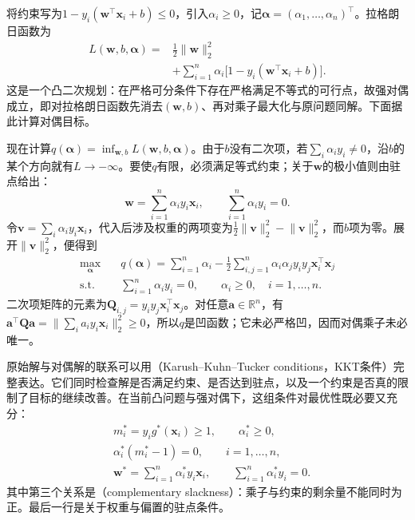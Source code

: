 将约束写为$1-y_i(\bm{w}^{\top}\bm{x}_i+b)\le0$，引入$\alpha_i\ge0$，记$\bm{\alpha}=(\alpha_1,\ldots,\alpha_n)^{\top}$。拉格朗日函数为
\begin{equation}
  \begin{aligned}
    L(\bm{w},b,\bm{\alpha})
    ={}&\frac12\lVert\bm{w}\rVert_2^2\\
      &+\sum_{i=1}^n\alpha_i
        \bigl[1-y_i(\bm{w}^{\top}\bm{x}_i+b)\bigr].
  \end{aligned}
  \label{eq:classification-svm-hard-lagrangian}
\end{equation}
这是一个凸二次规划：在严格可分条件下存在严格满足不等式的可行点，故强对偶成立，即对拉格朗日函数先消去$(\bm{w},b)$、再对乘子最大化与原问题同解。下面据此计算对偶目标。

现在计算$q(\bm{\alpha})=\inf_{\bm{w},b}L(\bm{w},b,\bm{\alpha})$。由于$b$没有二次项，若$\sum_i\alpha_i y_i\ne0$，沿$b$的某个方向就有$L\to-\infty$。要使$q$有限，必须满足等式约束；关于$\bm{w}$的极小值则由驻点给出：
\begin{equation}
  \bm{w}=\sum_{i=1}^n\alpha_i y_i\bm{x}_i,
  \qquad
  \sum_{i=1}^n\alpha_i y_i=0.
  \label{eq:classification-svm-stationarity}
\end{equation}
令$\bm{v}=\sum_i\alpha_i y_i\bm{x}_i$，代入后涉及权重的两项变为$\frac12\lVert\bm{v}\rVert_2^2-\lVert\bm{v}\rVert_2^2$，而$b$项为零。展开$\lVert\bm{v}\rVert_2^2$，便得到
\begin{equation}
  \begin{aligned}
    \max_{\bm{\alpha}}\quad&
      q(\bm{\alpha})
      =\sum_{i=1}^n\alpha_i
       -\frac12\sum_{i,j=1}^n
          \alpha_i\alpha_j y_i y_j
          \bm{x}_i^{\top}\bm{x}_j\\
    \text{s.t.}\quad&
      \sum_{i=1}^n\alpha_i y_i=0,\qquad
      \alpha_i\ge0,\quad i=1,\ldots,n.
  \end{aligned}
  \label{eq:classification-svm-hard-dual}
\end{equation}
二次项矩阵的元素为$\bm{Q}_{i,j}=y_i y_j\bm{x}_i^{\top}\bm{x}_j$。对任意$\bm{a}\in\mathbb{R}^n$，有$\bm{a}^{\top}\bm{Q}\bm{a}=\lVert\sum_i a_i y_i\bm{x}_i\rVert_2^2\ge0$，所以$q$是凹函数；它未必严格凹，因而对偶乘子未必唯一。

原始解与对偶解的联系可以用（Karush--Kuhn--Tucker conditions，KKT条件）完整表达。它们同时检查解是否满足约束、是否达到驻点，以及一个约束是否真的限制了目标的继续改善。在当前凸问题与强对偶下，这组条件对最优性既必要又充分：
\begin{equation}
  \begin{aligned}
    &m_i^{\ast}=y_i g^{\ast}(\bm{x}_i)\ge1,
      \qquad \alpha_i^{\ast}\ge0,\\
    &\alpha_i^{\ast}(m_i^{\ast}-1)=0,
      \qquad i=1,\ldots,n,\\
    &\bm{w}^{\ast}
      =\sum_{i=1}^n\alpha_i^{\ast}y_i\bm{x}_i,
      \qquad \sum_{i=1}^n\alpha_i^{\ast}y_i=0.
  \end{aligned}
  \label{eq:classification-svm-hard-kkt}
\end{equation}
其中第三个关系是（complementary slackness）：乘子与约束的剩余量不能同时为正。最后一行是关于权重与偏置的驻点条件。

